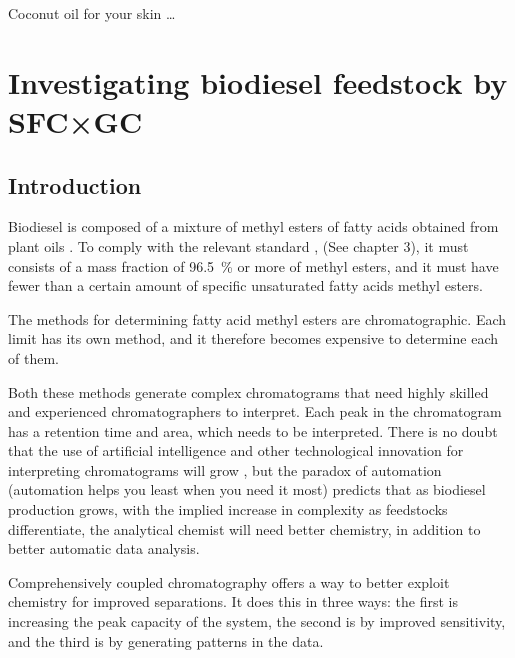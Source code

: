 
\begin{savequote}[45mm]
Coconut oil for your skin \ldots
{}
\end{savequote}

\chapter{Investigating biodiesel feedstock by SFC×GC} %

\label{Chapter6} %


\section{Introduction}

Biodiesel is composed of a mixture of methyl esters of fatty acids obtained from
plant oils \autocite{SANS1935}. To comply with the relevant standard
\autocite{SANS1935}, (See chapter 3), it must consists of a mass fraction of
\SI{96.5}{\percent} or more of methyl esters, and it must have fewer than a
certain amount of specific unsaturated fatty acids methyl esters.

The methods for determining fatty acid methyl esters are chromatographic. Each
limit has its own method, and it therefore becomes expensive to determine each
of them.
 
Both these methods generate complex chromatograms that need highly skilled and
experienced chromatographers to interpret. Each peak in the chromatogram has a
retention time and area, which needs to be interpreted. There is no doubt that
the use of artificial intelligence and other technological innovation for
interpreting chromatograms will grow , but the paradox of automation (automation helps you least when
you need it most)
predicts that as biodiesel production grows, with the implied increase in
complexity as feedstocks differentiate, the analytical chemist will need better
chemistry, in addition to better automatic data analysis.

Comprehensively coupled chromatography offers a way to better exploit chemistry
for improved separations. It does this in three ways: the first is increasing
the peak capacity of the system, the second is by improved sensitivity, and the
third is by generating patterns in the data.


